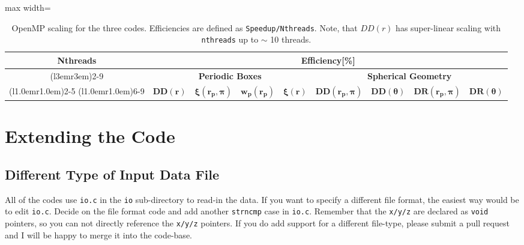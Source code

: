 \documentclass[12pt,titlepage]{article}
\let\stdsection\section
\newcommand{\xir}{\ensuremath{{DD(r)}}\xspace}
\newcommand{\xiofr}{\ensuremath{{\xi(r)}}\xspace}
\newcommand{\wprp}{\ensuremath{{w_p(r_p)}}\xspace}
\newcommand{\xirppi}{\ensuremath{{\xi(r_p,\pi)}}\xspace}
\begin{document}
\begin{table}
\centering
\caption{\footnotesize OpenMP scaling for the three codes. Efficiencies are defined 
as \texttt{Speedup/Nthreads}. Note, that \xir has super-linear scaling with \texttt{nthreads}
up to $\sim$ 10 threads.}
\begin{adjustbox}{max width=\textwidth}
\begin{tabular}{ccccccccc} 
\toprule
\multirow{3}{*}{\textbf{Nthreads}}   &
\multicolumn{8}{c}{\textbf{Efficiency[\%]}} \\
\cmidrule(l{3em}r{3em}){2-9}

                                     &
\multicolumn{4}{c}{\textbf{Periodic Boxes}}  &
\multicolumn{4}{c}{\textbf{Spherical Geometry}}  \\
\cmidrule(l{1.0em}r{1.0em}){2-5}
\cmidrule(l{1.0em}r{1.0em}){6-9}
                                               &
\multicolumn{1}{c}{$\boldsymbol{\xir}$}        &
\multicolumn{1}{c}{$\boldsymbol{\xirppi}$}     &
\multicolumn{1}{c}{$\boldsymbol{\wprp}$}       & 
\multicolumn{1}{c}{$\boldsymbol{\xiofr}$}      &
\multicolumn{1}{c}{$\boldsymbol{DD(r_p,\pi)}$} &
\multicolumn{1}{c}{$\boldsymbol{DD(\theta)}$}  &
\multicolumn{1}{c}{$\boldsymbol{DR(r_p,\pi)}$} & 
\multicolumn{1}{c}{$\boldsymbol{DR(\theta)}$}   \\
\midrule

\bottomrule
\end{tabular}
\end{adjustbox}
\label{table:openmp}
\end{table}


\clearpage
\stdsection{Extending the Code}
\subsection{Different Type of Input Data File}
All of the codes use \texttt{io.c} in the \texttt{io} sub-directory to read-in the data. If you want to specify a different file format, the easiest way would be to edit 
\texttt{io.c}. Decide on the file format code and add another \texttt{strncmp} case in \texttt{io.c}. Remember that the \texttt{x/y/z} are declared as \texttt{void} pointers, 
so you can not directly reference the \texttt{x/y/z} pointers. If you do add support for a different file-type, please submit a pull request and I will be happy to merge it into the 
code-base. 
\end{document}
